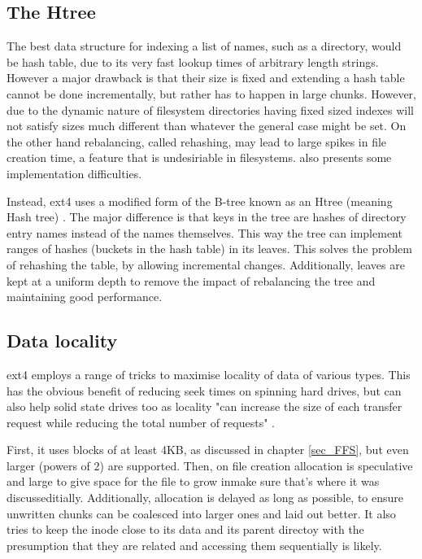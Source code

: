         \subsection{The Htree}

            The best data structure for indexing a list of names, such as a
            directory, would be hash table, due to its very fast lookup times
            of arbitrary length strings. However a major drawback is that their
            size is fixed and extending a hash table cannot be done
            incrementally, but rather has to happen in large chunks. However,
            due to the dynamic nature of filesystem directories having fixed
            sized indexes will not satisfy sizes much different than whatever
            the general case might be set. On the other hand rebalancing,
            called rehashing, may lead to large spikes in file creation time, a
            feature that is undesiriable in filesystems. \citeauthor{HTree}
            also presents some implementation difficulties.

            Instead, ext4 uses a modified form of the B-tree known as an Htree
            (meaning Hash tree) \cite{HTree}. The major difference is that keys
            in the tree are hashes of directory entry names instead of the
            names themselves. This way the tree can implement ranges of hashes
            (buckets in the hash table) in its leaves. This solves the problem
            of rehashing the table, by allowing incremental changes.
            Additionally, leaves are kept at a uniform depth to remove the
            impact of rebalancing the tree and maintaining good performance.

        \subsection{Data locality}

            ext4 employs a range of tricks to maximise locality of data of
            various types. This has the obvious benefit of reducing seek times
            on spinning hard drives, but can also help solid state drives too
            as locality "can increase the size of each transfer request while
            reducing the total number of requests" \cite{ext4_docs}.

            First, it uses blocks of at least 4KB, as discussed in chapter
            \ref{sec_FFS}, but even larger (powers of 2) are supported. Then,
            on file creation allocation is speculative and large to give space
            for the file to grow inmake sure that's where it was
            discusseditially. Additionally, allocation is delayed as long as
            possible, to ensure unwritten chunks can be coalesced into larger
            ones and laid out better. It also tries to keep the inode close to
            its data and its parent directoy with the presumption that they are
            related and accessing them sequentially is likely.

